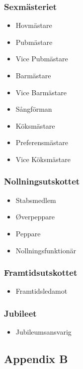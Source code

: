 \documentclass{dsekprotokoll}
\begin{document}
\begin{multicols}{2}
    \subsubsection*{Sexmästeriet}
    \begin{itemize}
        \item Hovmästare
        \item Pubmästare
        \item Vice Pubmästare
        \item Barmästare
        \item Vice Barmästare
        \item Sångförman
        \item Köksmästare
        \item Preferensmästare
        \item Vice Köksmästare
    \end{itemize}

    \subsubsection*{Nollningsutskottet}
    \begin{itemize}
        \item Stabsmedlem
        \item Øverpeppare
        \item Peppare
        \item Nollningsfunktionär
    \end{itemize}

    \subsubsection*{Framtidsutskottet}
    \begin{itemize}
        \item Framtidsledamot
    \end{itemize}

    \subsubsection*{Jubileet}
    \begin{itemize}
        \item Jubileumsansvarig
    \end{itemize}
\end{multicols}

\pagebreak
\subsection*{Appendix B}
\end{document}
